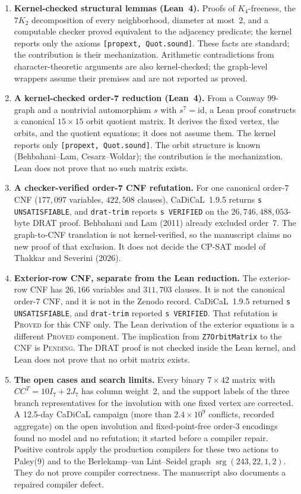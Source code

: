 \documentclass[10pt,a4paper]{article}
\begin{document}
\begin{enumerate}[leftmargin=1.5em, itemsep=0.5pt, topsep=0.5pt]
  \item \textbf{Kernel-checked structural lemmas (Lean~4).} Proofs of $K_4$-freeness, the $7K_2$ decomposition of every neighborhood, diameter at most~2, and a computable checker proved equivalent to the adjacency predicate; the kernel reports only the axioms \texttt{[propext, Quot.sound]}. These facts are standard; the contribution is their mechanization. Arithmetic contradictions from character-theoretic arguments are also kernel-checked; the graph-level wrappers assume their premises and are not reported as proved.
  \item \textbf{A kernel-checked order-7 reduction (Lean~4).} From a Conway 99-graph and a nontrivial automorphism $s$ with $s^7 = \mathrm{id}$, a Lean proof constructs a canonical $15 \times 15$ orbit quotient matrix. It derives the fixed vertex, the orbits, and the quotient equations; it does not assume them. The kernel reports only \texttt{[propext, Quot.sound]}. The orbit structure is known (Behbahani--Lam, Cesarz--Woldar); the contribution is the mechanization. Lean does not prove that no such matrix exists.
  \item \textbf{A checker-verified order-7 CNF refutation.} For one canonical order-7 CNF ($177{,}097$ variables, $422{,}508$ clauses), CaDiCaL~1.9.5 returns \texttt{s UNSATISFIABLE}, and \texttt{drat-trim} reports \texttt{s VERIFIED} on the $26{,}746{,}488{,}053$-byte DRAT proof. Behbahani and Lam (2011) already excluded order~7. The graph-to-CNF translation is not kernel-verified, so the manuscript claims no new proof of that exclusion. It does not decide the CP-SAT model of Thakkar and Severini (2026).
  \item \textbf{Exterior-row CNF, separate from the Lean reduction.} The exterior-row CNF has $26{,}166$ variables and $311{,}703$ clauses. It is not the canonical order-7 CNF, and it is not in the Zenodo record. CaDiCaL~1.9.5 returned \texttt{s UNSATISFIABLE}, and \texttt{drat-trim} reported \texttt{s VERIFIED}. That refutation is \textsc{Proved} for this CNF only. The Lean derivation of the exterior equations is a different \textsc{Proved} component. The implication from \texttt{Z7OrbitMatrix} to the CNF is \textsc{Pending}. The DRAT proof is not checked inside the Lean kernel, and Lean does not prove that no orbit matrix exists.
  \item \textbf{The open cases and search limits.} Every binary $7\times 42$ matrix with $CC^T = 10I_7 + 2J_7$ has column weight~2, and the support labels of the three branch representatives for the involution with one fixed vertex are corrected. A 12.5-day CaDiCaL campaign (more than $2.4 \times 10^9$ conflicts, recorded aggregate) on the open involution and fixed-point-free order-3 encodings found no model and no refutation; it started before a compiler repair. Positive controls apply the production compilers for these two actions to Paley(9) and to the Berlekamp--van Lint--Seidel graph $\operatorname{srg}(243,22,1,2)$. They do not prove compiler correctness. The manuscript also documents a repaired compiler defect.
\end{enumerate}
\end{document}
